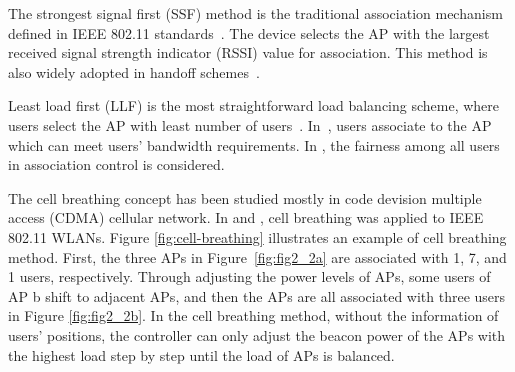 The strongest signal first (SSF) method is the traditional association mechanism defined in IEEE 802.11 standards~\cite{ieee2001ieee}. 
The device selects the AP with the largest received signal strength indicator (RSSI) value for association.
This method is also widely adopted in handoff schemes~\cite{teng2009d,wu2007proactive}.
	
Least load first (LLF) is the most straightforward load balancing scheme, where users select the  AP with least number of users~\cite{papanikos2001study}.
In~\cite{balachandran2002hot},  
users associate to the AP which 
	can meet users' bandwidth requirements. 
In \cite{bejerano2004fairness}, 
	the fairness among all users in association control is considered.

The cell breathing concept has been studied mostly in code devision multiple access (CDMA) cellular network. 
In \cite{bahl2007cell} and \cite{bejerano2009cell}, cell breathing was applied to IEEE 802.11 WLANs. 
Figure \ref{fig:cell-breathing} illustrates an example of cell breathing method. 
First, the three APs in Figure~\ref{fig:fig2_2a} are associated with 1, 7, and 1 users, respectively.
Through adjusting the power levels of APs, some users of AP b shift to adjacent APs, and then the APs are all associated with three users in Figure \ref{fig:fig2_2b}. 
In the cell breathing method, %
without the information of users' positions, 
the controller can only adjust the beacon power of the APs with the highest load step by step until the load of APs is balanced.

